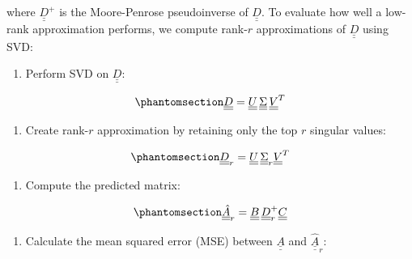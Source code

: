 \documentclass[
]{scrartcl}
\providecommand{\tightlist}{%
  \setlength{\itemsep}{0pt}\setlength{\parskip}{0pt}}
\begin{document}
\begin{refsection}
where \(\underline{\underline{D}}^+\) is the Moore-Penrose pseudoinverse
of \(\underline{\underline{D}}\). To evaluate how well a low-rank
approximation performs, we compute rank-\(r\) approximations of
\(\underline{\underline{D}}\) using SVD:

\begin{enumerate}
\def\labelenumi{\arabic{enumi}.}
\tightlist
\item
  Perform SVD on \(\underline{\underline{D}}\):
\end{enumerate}

\begin{equation}\phantomsection\label{eq-crossvalidation-svd-svd}{
\underline{\underline{D}} =
\underline{\underline{U}}\, \underline{\underline{\Sigma}} \,
\underline{\underline{V}}^T
}\end{equation}

\begin{enumerate}
\def\labelenumi{\arabic{enumi}.}
\setcounter{enumi}{1}
\tightlist
\item
  Create rank-\(r\) approximation by retaining only the top \(r\)
  singular values:
\end{enumerate}

\begin{equation}\phantomsection\label{eq-crossvalidation-svd-svd-rank}{
\underline{\underline{D}}_r = \underline{\underline{U}}\,
\underline{\underline{\Sigma}}_r \underline{\underline{V}}^T
}\end{equation}

\begin{enumerate}
\def\labelenumi{\arabic{enumi}.}
\setcounter{enumi}{2}
\tightlist
\item
  Compute the predicted matrix:
\end{enumerate}

\begin{equation}\phantomsection\label{eq-crossvalidation-svd-svd-pred}{
\underline{\underline{\hat{A}}}_r =
\underline{\underline{B}}\, \underline{\underline{D}}_r^+
\underline{\underline{C}}
}\end{equation}

\begin{enumerate}
\def\labelenumi{\arabic{enumi}.}
\setcounter{enumi}{3}
\tightlist
\item
  Calculate the mean squared error (MSE) between
  \(\underline{\underline{A}}\) and
  \(\underline{\underline{\hat{A}}}_r\):
\end{enumerate}


\end{refsection}
\end{document}
